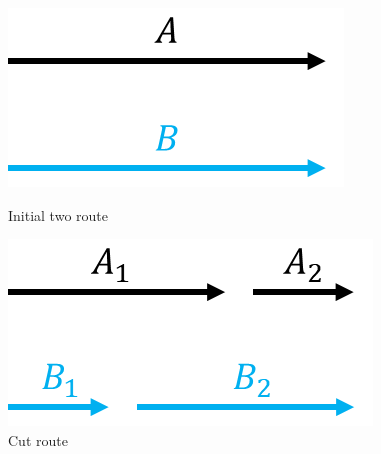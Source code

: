 \documentclass[journal]{IEEEtran}
\begin{document}
	\begin{figure}[htbp]
		\centering
		\begin{minipage}{0.49\linewidth}
			\centering
			\includegraphics[width=0.9\linewidth]{./picture/1.png}
			\caption{Initial two route}
			\label{2opt 1}%
		\end{minipage}
		\begin{minipage}{0.49\linewidth}
			\centering
			\includegraphics[width=0.9\linewidth]{./picture/2.png}
			\caption{Cut route}
			\label{2opt 2}%
		\end{minipage}
		

\end{figure}
\end{document}
